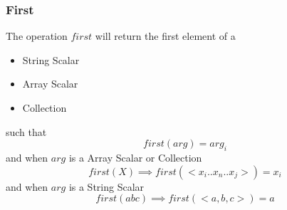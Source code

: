 \documentclass[../main.tex]{subfiles}
\begin{document}
\subsubsection{First}
The operation $first$ will return the first element of a
\begin{itemize}
\item String Scalar
\item Array Scalar
\item Collection
\end{itemize}
such that
$$first(arg) = arg_{i}$$
and when $arg$ is a Array Scalar or Collection
$$first(X) \implies first(<x_{i}..x_{n}..x_{j}>) = x_{i}$$
and when $arg$ is a String Scalar
$$first(abc) \implies first(<a, b, c>) = a$$
\end{document}

